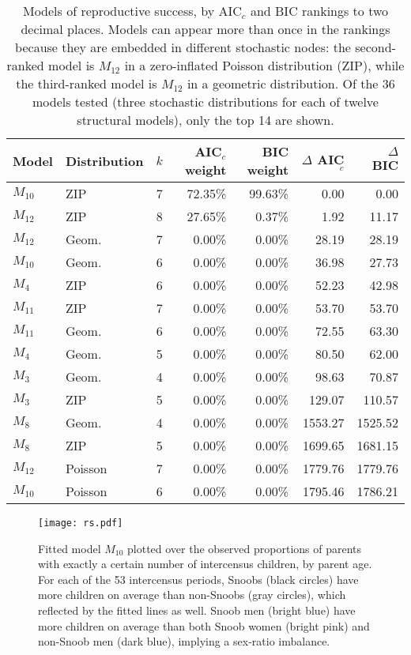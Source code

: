 \documentclass[11pt]{article}
\begin{document}
\begin{table}[htbp]
  \centering
    \begin{tabular}{llrrrrr}
    \hline
    \hline
    Model & Distribution & $k$ & AIC$_c$ weight & BIC weight & $\Delta$ AIC$_c$ & $\Delta$ BIC \\
    \hline
    $M_{10}$ & ZIP   & 7     & 72.35\% & 99.63\% & 0.00  & 0.00 \\
    $M_{12}$ & ZIP   & 8     & 27.65\% & 0.37\% & 1.92  & 11.17 \\
    $M_{12}$ & Geom. & 7     & 0.00\% & 0.00\% & 28.19 & 28.19 \\
    $M_{10}$ & Geom. & 6     & 0.00\% & 0.00\% & 36.98 & 27.73 \\
    $M_4$  & ZIP   & 6     & 0.00\% & 0.00\% & 52.23 & 42.98 \\
    $M_{11}$ & ZIP   & 7     & 0.00\% & 0.00\% & 53.70 & 53.70 \\
    $M_{11}$ & Geom. & 6     & 0.00\% & 0.00\% & 72.55 & 63.30 \\
    $M_{4}$ & Geom. & 5     & 0.00\% & 0.00\% & 80.50 & 62.00 \\
    $M_3$  & Geom. & 4     & 0.00\% & 0.00\% & 98.63 & 70.87 \\
    $M_3$  & ZIP   & 5     & 0.00\% & 0.00\% & 129.07 & 110.57 \\
    $M_8$  & Geom. & 4     & 0.00\% & 0.00\% & 1553.27 & 1525.52 \\
    $M_8$  & ZIP   & 5     & 0.00\% & 0.00\% & 1699.65 & 1681.15 \\
    $M_{12}$ & Poisson & 7     & 0.00\% & 0.00\% & 1779.76 & 1779.76 \\
    $M_{10}$ & Poisson & 6     & 0.00\% & 0.00\% & 1795.46 & 1786.21 \\
    \hline
    \end{tabular}%
    \caption{Models of reproductive success, by AIC$_c$ and BIC rankings to two decimal places.  Models can appear more than once in the rankings because they are embedded in different stochastic nodes: the second-ranked model is $M_{12}$ in a zero-inflated Poisson distribution (ZIP), while the third-ranked model is $M_{12}$ in a geometric distribution.  Of the 36 models tested (three stochastic distributions for each of twelve structural models), only the top 14 are shown.}
  \label{tab:RScompare}%
\end{table}%


\begin{figure}[t]
\begin{center}
\texttt{[image: rs.pdf]}
\caption{Fitted model $M_{10}$ plotted over the observed proportions of parents with exactly a certain number of intercensus children, by parent age.  For each of the 53 intercensus periods, Snoobs (black circles) have more children on average than non-Snoobs (gray circles), which reflected by the fitted lines as well.  Snoob men (bright blue) have more children on average than both Snoob women (bright pink) and non-Snoob men (dark blue), implying a sex-ratio imbalance.}
\label{fig:rs}
\end{center}
\end{figure}
\end{document}
